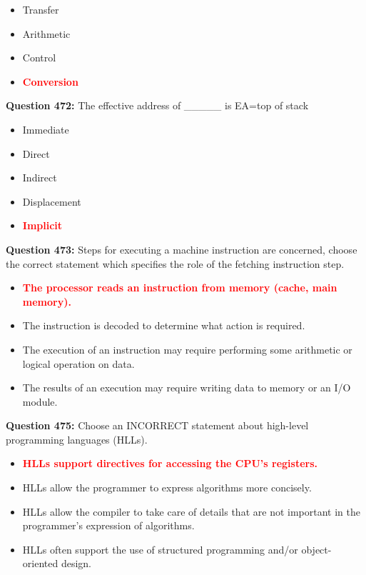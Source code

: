 \documentclass[12pt,a4paper]{article}
\begin{document}
\begin{itemize}
    \item[\textbf{A.}] Transfer
    \item[\textbf{B.}] Arithmetic
    \item[\textbf{C.}] Control
    \item[\textbf{D.}] \textcolor{red}{\textbf{Conversion}}
\end{itemize}

\vspace{0.5cm}

\textbf{Question 472:} The effective address of _____ is EA=top of stack

\begin{itemize}
    \item[\textbf{A.}] Immediate
    \item[\textbf{B.}] Direct
    \item[\textbf{C.}] Indirect
    \item[\textbf{D.}] Displacement
    \item[\textbf{E.}] \textcolor{red}{\textbf{Implicit}}
\end{itemize}

\vspace{0.5cm}

\textbf{Question 473:} Steps for executing a machine instruction are concerned, choose the correct statement which specifies the role of the fetching instruction step.

\begin{itemize}
    \item[\textbf{A.}] \textcolor{red}{\textbf{The processor reads an instruction from memory (cache, main memory).}}
    \item[\textbf{B.}] The instruction is decoded to determine what action is required.
    \item[\textbf{C.}] The execution of an instruction may require performing some arithmetic or logical operation on data.
    \item[\textbf{D.}] The results of an execution may require writing data to memory or an I/O module.
\end{itemize}

\vspace{0.5cm}

\textbf{Question 475:} Choose an INCORRECT statement about high-level programming languages (HLLs).

\begin{itemize}
    \item[\textbf{A.}] \textcolor{red}{\textbf{HLLs support directives for accessing the CPU's registers.}}
    \item[\textbf{B.}] HLLs allow the programmer to express algorithms more concisely.
    \item[\textbf{C.}] HLLs allow the compiler to take care of details that are not important in the programmer's expression of algorithms.
    \item[\textbf{D.}] HLLs often support the use of structured programming and/or object-oriented design.
\end{itemize}
\end{document}

